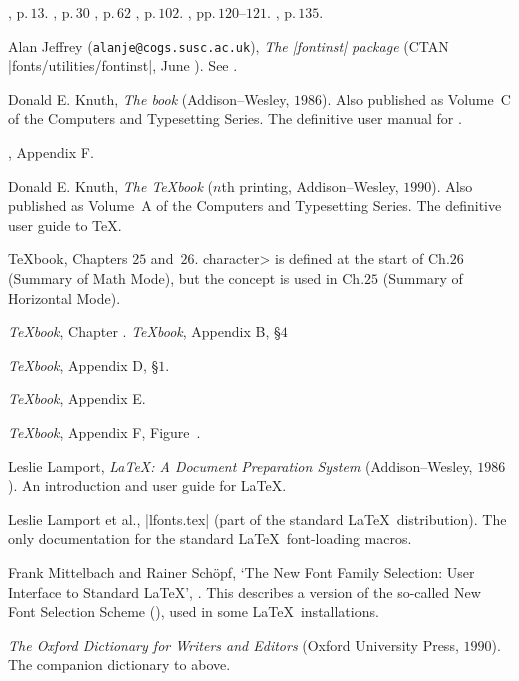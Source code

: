 \Ibid, p.\,$13$.
 \Ibid, p.\,$30$
 \Ibid, p.\,$62$
 \Ibid, p.\,$102$.
 \Ibid, pp.\,$120$--$121$.
 \Ibid, p.\,$135$.

	Alan Jeffrey ({\tt alanje@cogs.susc.ac.uk}), {\it The |fontinst|
	package} (CTAN |fonts/utilities/fontinst|, June ).  See
	.

	Donald E. Knuth, {\it The \MF book} (Addison--Wesley,
	$1986$).  Also published as Volume~C of the Computers and
	Typesetting Series.  The definitive user manual for \MF.

	\Ibid, Appendix F.

	Donald E. Knuth, {\it The \TeX book} ($n$th printing,
	Addison--Wesley, $1990$).  Also published as Volume~A of the
	Computers and Typesetting Series.  The definitive user guide to
	\TeX.

	{\TeX book}, Chapters $25$ and~$26$.  \<character> is defined at the
	start of Ch.\thinspace $26$ (Summary of Math Mode), but the concept is
	used in Ch.\thinspace $25$ (Summary of Horizontal Mode).

	{\it \TeX book}, Chapter .
	{\it \TeX book}, Appendix B, \S$4$

	{\it \TeX book}, Appendix D, \S$1$.

	{\it \TeX book}, Appendix E.

	{\it \TeX book}, Appendix F, Figure~.

	Leslie Lamport, {\it \LaTeX: A Document Preparation System}
	(Addison--Wesley, $1986$).  An introduction and user guide for
	\LaTeX.

	Leslie Lamport et al., |lfonts.tex| (part of the standard
	\LaTeX\ distribution).  The only documentation for the standard
	\LaTeX\ font-loading macros.

	Frank Mittelbach and Rainer Sch\"opf, `The New Font Family
	Selection: User Interface to Standard \LaTeX',
	.  This describes a version of the
	so-called New Font Selection Scheme (), used in some
	\LaTeX\ installations.

	{\it The Oxford Dictionary for Writers and Editors} (Oxford
	University Press, $1990$).  The companion dictionary to
	 above.

